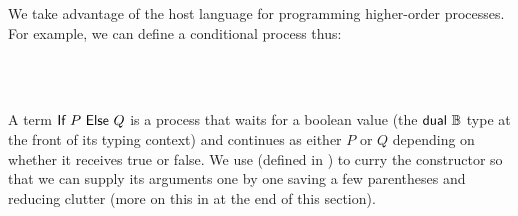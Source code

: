 We take advantage of the host language for programming higher-order processes.
For example, we can define a conditional process thus:

\begin{code}%
\>[0]\AgdaSpace{}%
\AgdaSymbol{:}\AgdaSpace{}%
\AgdaFunction{∀[}\AgdaSpace{}%
\AgdaSpace{}%
\AgdaSpace{}%
\AgdaSpace{}%
\AgdaSpace{}%
\AgdaSymbol{(}\AgdaSpace{}%
\AgdaSpace{}%
\AgdaSymbol{)}\AgdaSpace{}%
\AgdaSpace{}%
\AgdaSpace{}%
\AgdaFunction{]}\<%
\\
\>[0]\AgdaSpace{}%
\AgdaSpace{}%
\AgdaSpace{}%
\AgdaSpace{}%
\AgdaSymbol{=}\AgdaSpace{}%
\AgdaSpace{}%
\AgdaSpace{}%
\AgdaSpace{}%
\AgdaSymbol{(}\AgdaOperator{\AgdaInductiveConstructor{<}}\AgdaSpace{}%
\AgdaSymbol{)}%
\>[103I]\AgdaSymbol{(}%
\>[38]\AgdaSpace{}%
\AgdaSymbol{(}\AgdaSpace{}%
\AgdaSpace{}%
\AgdaOperator{\AgdaInductiveConstructor{<}}\AgdaSpace{}%
\AgdaSpace{}%
\AgdaSpace{}%
\AgdaSymbol{)}\<%
\\
\>[.][@{}l@{}]\<[103I]%
\>[35]\AgdaOperator{\AgdaInductiveConstructor{,}}%
\>[38]\AgdaSpace{}%
\AgdaSymbol{(}\AgdaSpace{}%
\AgdaSpace{}%
\AgdaOperator{\AgdaInductiveConstructor{<}}\AgdaSpace{}%
\AgdaSpace{}%
\AgdaSpace{}%
\AgdaSymbol{))}\<%
\end{code}

A term $\AgdaFunction{If}~P~\AgdaFunction{Else}~Q$ is a process that waits for a
boolean value (\cf the $\AgdaFunction{dual}~\mathbb{B}$ type at the front of its
typing context) and continues as either $P$ or $Q$ depending on whether it
receives true or false. We use  (defined in
) to curry the constructor
 so that we can supply its arguments one by one
saving a few parentheses and reducing clutter (more on this in 
at the end of this section).

